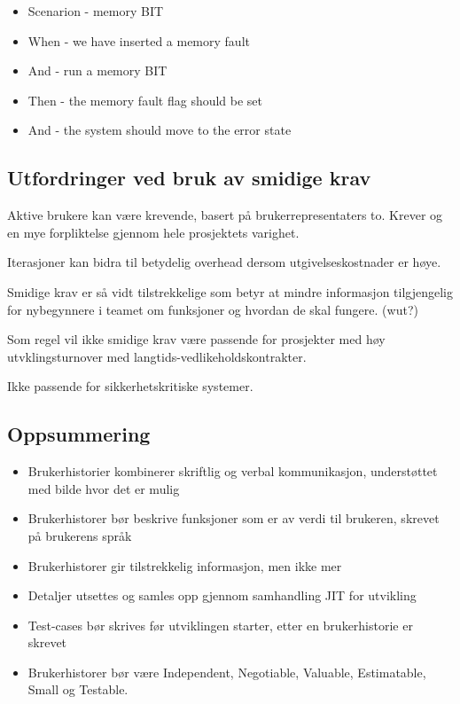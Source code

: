 \begin{itemize}
\item
  Scenarion - memory BIT
\item
  When - we have inserted a memory fault
\item
  And - run a memory BIT
\item
  Then - the memory fault flag should be set
\item
  And - the system should move to the error state
\end{itemize}
\subsection{Utfordringer ved bruk av smidige krav}

Aktive brukere kan være krevende, basert på brukerrepresentaters to.
Krever og en mye forpliktelse gjennom hele prosjektets varighet.

Iterasjoner kan bidra til betydelig overhead dersom utgivelseskostnader
er høye.

Smidige krav er så vidt tilstrekkelige som betyr at mindre informasjon
tilgjengelig for nybegynnere i teamet om funksjoner og hvordan de skal
fungere. (wut?)

Som regel vil ikke smidige krav være passende for prosjekter med høy
utvklingsturnover med langtids-vedlikeholdskontrakter.

Ikke passende for sikkerhetskritiske systemer.

\subsection{Oppsummering}

\begin{itemize}
\item
  Brukerhistorier kombinerer skriftlig og verbal kommunikasjon,
  understøttet med bilde hvor det er mulig
\item
  Brukerhistorer bør beskrive funksjoner som er av verdi til brukeren,
  skrevet på brukerens språk
\item
  Brukerhistorer gir tilstrekkelig informasjon, men ikke mer
\item
  Detaljer utsettes og samles opp gjennom samhandling JIT for utvikling
\item
  Test-cases bør skrives før utviklingen starter, etter en
  brukerhistorie er skrevet
\item
  Brukerhistorer bør være Independent, Negotiable, Valuable,
  Estimatable, Small og Testable.
\end{itemize}
